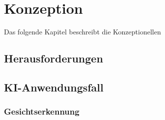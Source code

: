 \chapter{Konzeption}
Das folgende Kapitel beschreibt die Konzeptionellen 
\section{Herausforderungen}
\section{KI-Anwendungsfall}
\subsection{Gesichtserkennung}
